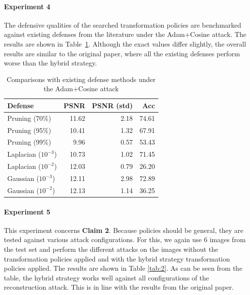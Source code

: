 \paragraph{Experiment 4} The defensive qualities of the searched transformation policies are benchmarked against existing defenses from the literature \cite{zhu2019} \cite{wei2020} under the Adam+Cosine attack. The results are shown in Table~\ref{tab:3}. Although the exact values differ slightly, the overall results are similar to the original paper, where all the existing defenses perform worse than the hybrid strategy.

\begin{table}[htb]
    \centering
        \begin{tabular}{lrrr}
        \hline
         Defense               &   PSNR &   PSNR (std) &   Acc \\
        \hline
         Pruning (70\%)         &       11.62 &       2.18 & 74.61 \\
         Pruning (95\%)         &       10.41 &       1.32 & 67.91 \\
         Pruning (99\%)         &        9.96 &       0.57 & 53.43 \\
         Laplacian ($10^{-3}$) &       10.73 &       1.02 & 71.45 \\
         Laplacian ($10^{-2}$) &       12.03 &       0.79 & 26.20 \\
         Gaussian ($10^{-3}$)  &       12.11 &       2.98 & 72.89 \\
         Gaussian ($10^{-2}$)  &       12.13 &       1.14 & 36.25 \\
        \hline
    \end{tabular}
    \caption{Comparisons with existing defense methods under the Adam+Cosine attack}
    \label{tab:3}
    \vspace{-8mm}
\end{table}

\paragraph{Experiment 5} This experiment concerns \textbf{Claim 2}. Because policies should be general, they are tested against various attack configurations. For this, we again use $6$ images from the test set and perform the different attacks on the images without the transformation policies applied and with the hybrid strategy transformation policies applied. The results are shown in Table \ref{tab:2}. As can be seen from the table, the hybrid strategy works well against all configurations of the reconstruction attack. This is in line with the results from the original paper.

